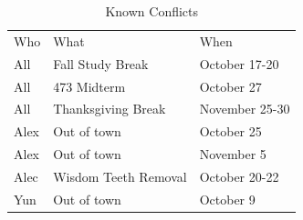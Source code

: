 \documentclass[12pt]{article}
\begin{document}
\begin{table}[h!]
    \centering
    \caption{Known Conflicts}
    \begin{tabular}{lll}
        Who & What & When\\
        All & Fall Study Break & October 17-20\\
        All & 473 Midterm & October 27\\
        All & Thanksgiving Break & November 25-30\\
        Alex & Out of town & October 25\\
        Alex & Out of town & November 5\\
        Alec & Wisdom Teeth Removal & October 20-22\\
        Yun & Out of town & October 9\\
    \end{tabular}
\end{table}

% 
% 
\end{document}
